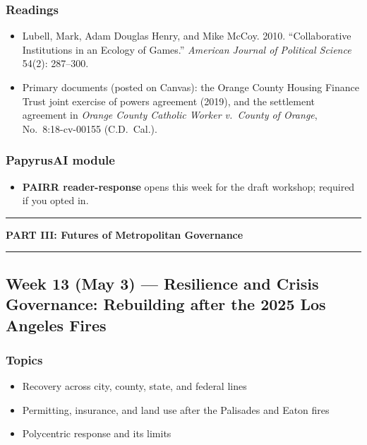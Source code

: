 \documentclass[12pt]{article}
\begin{document}
    \subsubsection*{Readings}
        \begin{itemize}
            \item Lubell, Mark, Adam Douglas Henry, and Mike McCoy. 2010. ``Collaborative Institutions in an Ecology of Games.'' \emph{American Journal of Political Science} 54(2): 287--300.
            \item Primary documents (posted on Canvas): the Orange County Housing Finance Trust joint exercise of powers agreement (2019), and the settlement agreement in \emph{Orange County Catholic Worker v.\ County of Orange}, No.\ 8:18-cv-00155 (C.D.\ Cal.).
        \end{itemize}
    \subsubsection*{PapyrusAI module}
        \begin{itemize}
            \item \textbf{PAIRR reader-response} opens this week for the draft workshop; required if you opted in.
        \end{itemize}

\bigskip
\noindent\rule{\textwidth}{0.6pt}
\begin{center}\textbf{PART III: Futures of Metropolitan Governance}\end{center}
\noindent\rule{\textwidth}{0.6pt}

\subsection*{Week 13 (May 3) --- Resilience and Crisis Governance: Rebuilding after the 2025 Los Angeles Fires}
    \subsubsection*{Topics}
        \begin{itemize}
            \item Recovery across city, county, state, and federal lines
            \item Permitting, insurance, and land use after the Palisades and Eaton fires
            \item Polycentric response and its limits
        \end{itemize}
\end{document}
